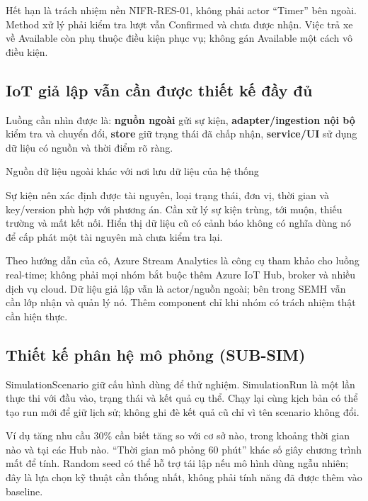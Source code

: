 Hết hạn là trách nhiệm nền NIFR-RES-01, không phải actor ``Timer'' bên ngoài. Method xử lý phải kiểm tra lượt vẫn Confirmed và chưa được nhận. Việc trả xe về Available còn phụ thuộc điều kiện phục vụ; không gán Available một cách vô điều kiện.

\subsection{IoT giả lập vẫn cần được thiết kế đầy đủ}
Luồng cần nhìn được là: \textbf{nguồn ngoài} gửi sự kiện, \textbf{adapter/ingestion nội bộ} kiểm tra và chuyển đổi, \textbf{store} giữ trạng thái đã chấp nhận, \textbf{service/UI} sử dụng dữ liệu có nguồn và thời điểm rõ ràng.

  {Nguồn dữ liệu ngoài khác với nơi lưu dữ liệu của hệ thống}

Sự kiện nên xác định được tài nguyên, loại trạng thái, đơn vị, thời gian và key/version phù hợp với phương án. Cần xử lý sự kiện trùng, tới muộn, thiếu trường và mất kết nối. Hiển thị dữ liệu cũ có cảnh báo không có nghĩa dùng nó để cấp phát một tài nguyên mà chưa kiểm tra lại.

Theo hướng dẫn của cô, Azure Stream Analytics là công cụ tham khảo cho luồng real-time; không phải mọi nhóm bắt buộc thêm Azure IoT Hub, broker và nhiều dịch vụ cloud. Dữ liệu giả lập vẫn là actor/nguồn ngoài; bên trong SEMH vẫn cần lớp nhận và quản lý nó. Thêm component chỉ khi nhóm có trách nhiệm thật cần hiện thực.

\subsection{Thiết kế phân hệ mô phỏng (SUB-SIM)}
SimulationScenario giữ cấu hình dùng để thử nghiệm. SimulationRun là một lần thực thi với đầu vào, trạng thái và kết quả cụ thể. Chạy lại cùng kịch bản có thể tạo run mới để giữ lịch sử; không ghi đè kết quả cũ chỉ vì tên scenario không đổi.

Ví dụ tăng nhu cầu 30\% cần biết tăng so với cơ sở nào, trong khoảng thời gian nào và tại các Hub nào. ``Thời gian mô phỏng 60 phút'' khác số giây chương trình mất để tính. Random seed có thể hỗ trợ tái lập nếu mô hình dùng ngẫu nhiên; đây là lựa chọn kỹ thuật cần thống nhất, không phải tính năng đã được thêm vào baseline.


